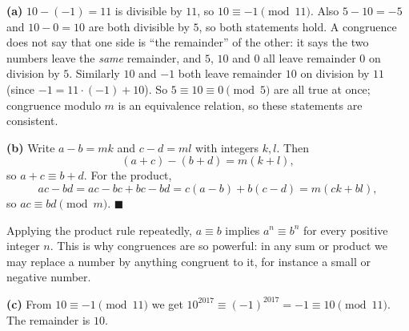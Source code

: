 \textbf{(a)} $10-(-1)=11$ is divisible by $11$, so $10\equiv-1\pmod{11}$. Also $5-10=-5$ and $10-0=10$ are both divisible by $5$, so both statements hold. A congruence does not say that one side is ``the remainder'' of the other: it says the two numbers leave the \emph{same} remainder, and $5$, $10$ and $0$ all leave remainder $0$ on division by $5$. Similarly $10$ and $-1$ both leave remainder $10$ on division by $11$ (since $-1=11\cdot(-1)+10$). So $5\equiv10\equiv0\pmod5$ are all true at once; congruence modulo $m$ is an equivalence relation, so these statements are consistent.

\textbf{(b)} Write $a-b=mk$ and $c-d=ml$ with integers $k,l$. Then
\[
(a+c)-(b+d)=m(k+l),
\]
so $a+c\equiv b+d$. For the product,
\[
ac-bd=ac-bc+bc-bd=c(a-b)+b(c-d)=m(ck+bl),
\]
so $ac\equiv bd\pmod m$. $\blacksquare$

Applying the product rule repeatedly, $a\equiv b$ implies $a^n\equiv b^n$ for every positive integer $n$. This is why congruences are so powerful: in any sum or product we may replace a number by anything congruent to it, for instance a small or negative number.

\textbf{(c)} From $10\equiv-1\pmod{11}$ we get $10^{2017}\equiv(-1)^{2017}=-1\equiv10\pmod{11}$. The remainder is $\boxed{10}$.
